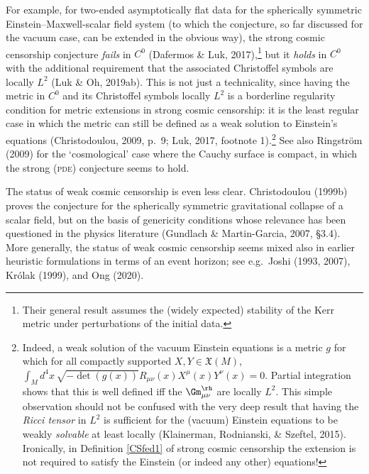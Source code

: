\documentclass[12pt]{article}
\newcommand{\pde}{\textsc{pde}}
\newcommand{\XM}{\mathfrak{X}(M)}
\begin{document}
  For example, for two-ended asymptotically flat data for the spherically symmetric Einstein--Max\-well-scalar field system (to which the  conjecture, so far discussed for the vacuum case, can be extended in the obvious way), the strong cosmic censorship conjecture \emph{fails} in $C^0$ (Dafermos \& Luk, 2017),\footnote{Their general result assumes the (widely expected) stability of the Kerr metric under perturbations of the initial data.}
   but it \emph{holds} in $C^0$ with the additional requirement that the associated Christoffel symbols are locally $L^2$ (Luk \& Oh, 2019ab). This is not just a technicality, since
having the metric in $C^0$  and its Christoffel symbols  locally  $L^2$ is a borderline
   regularity condition for metric extensions in strong cosmic censorship: it is the least regular case in which the metric 
    can still be  defined as a weak solution to Einstein's equations (Christodoulou, 2009, p.\ 9; Luk, 2017, footnote 1).\footnote{Indeed, a weak solution of the vacuum Einstein equations is a metric $g$ for which  for all compactly supported $X,Y\in\XM$,
$\int_M d^4x\, \sqrt{-\det(g(x))} R_{\mu\nu}(x)X^{\mu}(x)Y^{\nu}(x)=0$. Partial integration shows that this is well defined iff the $\Gm_{\mu\nu}^{\rh}$ are  locally $L^2$. This simple observation should not be confused with the very deep result that having 
 the \emph{Ricci tensor} in $L^2$ is sufficient for the (vacuum)  Einstein equations to be weakly \emph{solvable} at least locally
(Klainerman,   Rodnianski, \& Szeftel, 2015). Ironically, in  Definition \ref{CSfed1} of strong cosmic censorship 
 the extension is not required to satisfy the Einstein (or indeed any other) equations! } See  also Ringstr\"{o}m (2009) for the 
`cosmological'  case  where the Cauchy surface is 
 compact, in which the strong (\pde) conjecture seems to hold.


 The status of weak cosmic censorship is even less clear. Christodoulou (1999b)  proves the conjecture for the spherically symmetric gravitational collapse of a scalar field, but on the basis of genericity conditions whose  relevance has been questioned in the physics literature (Gundlach \& Martin-Garcia, 2007, \S 3.4). More generally, the status of weak cosmic censorship seems mixed also in earlier heuristic formulations in terms of  an event horizon; see e.g.\ Joshi (1993, 2007),  Kr\'{o}lak (1999), and Ong (2020).
\end{document}
